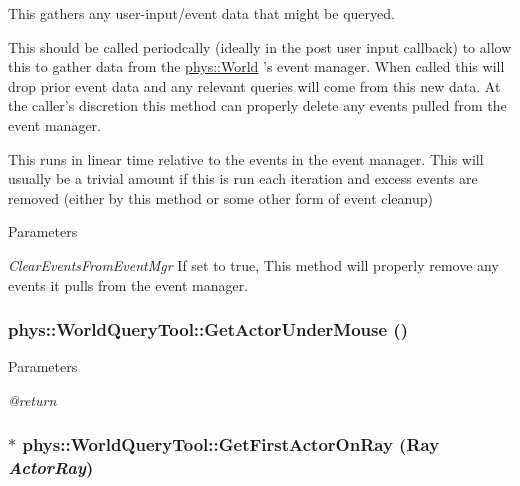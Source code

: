 This gathers any user-\/input/event data that might be queryed. 

This should be called periodcally (ideally in the post user input callback) to allow this to gather data from the \hyperlink{classphys_1_1World}{phys::World} 's event manager. When called this will drop prior event data and any relevant queries will come from this new data. At the caller's discretion this method can properly delete any events pulled from the event manager. \par
 \par
 This runs in linear time relative to the events in the event manager. This will usually be a trivial amount if this is run each iteration and excess events are removed (either by this method or some other form of event cleanup) 
\begin{DoxyParams}{Parameters}
\item[{\em ClearEventsFromEventMgr}]If set to true, This method will properly remove any events it pulls from the event manager. \end{DoxyParams}
\hypertarget{classphys_1_1WorldQueryTool_a85c3bcafc9ceea4ed485ff457d7b1f7b}{
\subsubsection[{GetActorUnderMouse}]{ phys::WorldQueryTool::GetActorUnderMouse ()}}
\label{d8/d69/classphys_1_1WorldQueryTool_a85c3bcafc9ceea4ed485ff457d7b1f7b}

\begin{DoxyParams}{Parameters}
\item[{\em @return}]\end{DoxyParams}
\hypertarget{classphys_1_1WorldQueryTool_a8d26735297b1c0368739f0ba05ca6a15}{
\subsubsection[{GetFirstActorOnRay}]{$\ast$ phys::WorldQueryTool::GetFirstActorOnRay ({\bf Ray} {\em ActorRay})}}
\label{d8/d69/classphys_1_1WorldQueryTool_a8d26735297b1c0368739f0ba05ca6a15}

